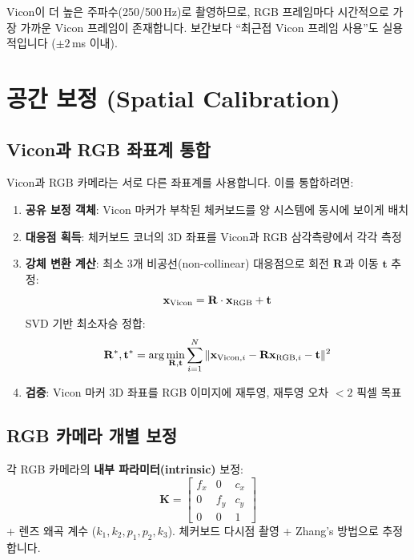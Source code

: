 \documentclass[11pt, a4paper]{report}
\begin{document}
\begin{remark}
Vicon이 더 높은 주파수(250/500\,Hz)로 촬영하므로, RGB 프레임마다 시간적으로 가장 가까운 Vicon 프레임이 존재합니다. 보간보다 ``최근접 Vicon 프레임 사용''도 실용적입니다 ($\pm 2$\,ms 이내).
\end{remark}


\section{공간 보정 (Spatial Calibration)}
\label{sec:calibration}

\subsection{Vicon과 RGB 좌표계 통합}

Vicon과 RGB 카메라는 서로 다른 좌표계를 사용합니다. 이를 통합하려면:

\begin{enumerate}[leftmargin=*]
  \item \textbf{공유 보정 객체}: Vicon 마커가 부착된 체커보드를 양 시스템에 동시에 보이게 배치
  \item \textbf{대응점 획득}: 체커보드 코너의 3D 좌표를 Vicon과 RGB 삼각측량에서 각각 측정
  \item \textbf{강체 변환 계산}: 최소 3개 비공선(non-collinear) 대응점으로 회전 $\mathbf{R}$과 이동 $\mathbf{t}$ 추정:
  \begin{equation}
    \mathbf{x}_{\text{Vicon}} = \mathbf{R} \cdot \mathbf{x}_{\text{RGB}} + \mathbf{t}
  \end{equation}
  SVD 기반 최소자승 정합:
  \begin{equation}
    \mathbf{R}^*, \mathbf{t}^* = \arg\min_{\mathbf{R}, \mathbf{t}} \sum_{i=1}^{N} \| \mathbf{x}_{\text{Vicon},i} - \mathbf{R} \mathbf{x}_{\text{RGB},i} - \mathbf{t} \|^2
  \end{equation}
  \item \textbf{검증}: Vicon 마커 3D 좌표를 RGB 이미지에 재투영, 재투영 오차 $<2$ 픽셀 목표
\end{enumerate}

\subsection{RGB 카메라 개별 보정}

각 RGB 카메라의 \textbf{내부 파라미터(intrinsic)} 보정:
\begin{equation}
\mathbf{K} = \begin{bmatrix} f_x & 0 & c_x \\ 0 & f_y & c_y \\ 0 & 0 & 1 \end{bmatrix}
\end{equation}
+ 렌즈 왜곡 계수 ($k_1, k_2, p_1, p_2, k_3$). 체커보드 다시점 촬영 + Zhang's 방법으로 추정합니다.
\end{document}
